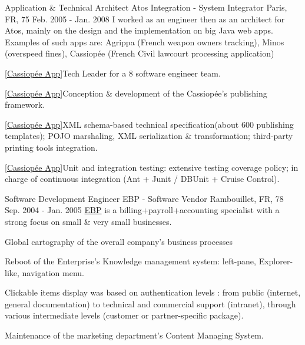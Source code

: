 \begin{cventries}
  \cventry
    {Application \& Technical Architect} %
    {Atos Integration - System Integrator} %
    {Paris, FR, 75} %
    {Feb. 2005 - Jan. 2008} %
{
I worked as an engineer then as an architect for Atos, mainly on the design and the implementation on big Java web apps. Examples of such apps are: Agrippa (French weapon owners tracking), Minos (overspeed fines), Cassiopée (French Civil lawcourt processing application)
} %
{
      \begin{cvitems} %
        \item {[\href{http://www.justice.gouv.fr/template/cache/embeds/embed-2086.html}{Cassiopée App}]Tech Leader for a 8 software engineer team.}
        \item {[\href{http://www.justice.gouv.fr/template/cache/embeds/embed-2086.html}{Cassiopée App}]Conception \& development of the Cassiopée's publishing framework.}
        \item {[\href{http://www.justice.gouv.fr/template/cache/embeds/embed-2086.html}{Cassiopée App}]XML schema-based technical specification(about 600 publishing templates); POJO marshaling, XML serialization \& transformation; third-party printing tools integration.}
        \item {[\href{http://www.justice.gouv.fr/template/cache/embeds/embed-2086.html}{Cassiopée App}]Unit and integration testing: extensive testing coverage policy; in charge of continuous integration (Ant + Junit / DBUnit + Cruise Control).}
      \end{cvitems}
} %

  \cventry
    {Software Development Engineer} %
    {EBP - Software Vendor} %
    {Rambouillet, FR, 78} %
    {Sep. 2004 - Jan. 2005} %
    {\href{https://www.ebp.com}{EBP} is a billing+payroll+accounting specialist with a strong focus on small \& very small businesses.} %
{
      \begin{cvitems} %
        \item {Global cartography of the overall company's business processes}
        \item {Reboot of the Enterprise’s Knowledge management system: left-pane, Explorer-like, navigation menu.}
        \item {Clickable items display was based on authentication levels : from public (internet, general documentation) to technical and commercial support (intranet), through various intermediate levels (customer or partner-specific package).}
        \item {Maintenance of the marketing department's Content Managing System.}
      \end{cvitems}
} %


\end{cventries}
